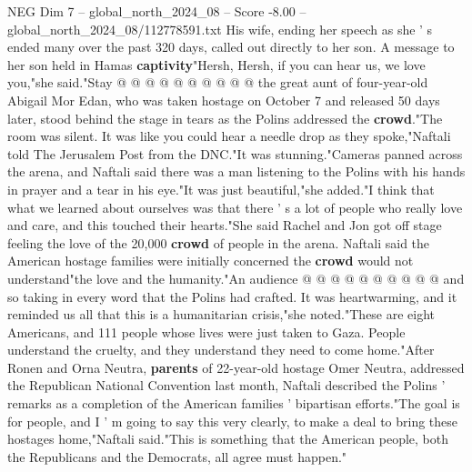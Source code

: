 \begin{textsample}{NEG Dim 7 – global\_north\_2024\_08 – Score -8.00 – global\_north\_2024\_08/112778591.txt}
His wife, ending her speech as she ' s ended many over the past 320 days, called out directly to her son.
A message to her son held in Hamas \textbf{captivity}"Hersh, Hersh, if you can hear us, we love you,"she said."Stay @ @ @ @ @ @ @ @ @ @ the great aunt of four-year-old Abigail Mor Edan, who was taken hostage on October 7 and released 50 days later, stood behind the stage in tears as the Polins addressed the \textbf{crowd}."The room was silent.
It was like you could hear a needle drop as they spoke,"Naftali told The Jerusalem Post from the DNC."It was stunning."Cameras panned across the arena, and Naftali said there was a man listening to the Polins with his hands in prayer and a tear in his eye."It was just beautiful,"she added."I think that what we learned about ourselves was that there ' s a lot of people who really love and care, and this touched their hearts."She said Rachel and Jon got off stage feeling the love of the 20,000 \textbf{crowd} of people in the arena.
Naftali said the American hostage families were initially concerned the \textbf{crowd} would not understand"the love and the humanity."An audience @ @ @ @ @ @ @ @ @ @ and so taking in every word that the Polins had crafted.
It was heartwarming, and it reminded us all that this is a humanitarian crisis,"she noted."These are eight Americans, and 111 people whose lives were just taken to Gaza.
People understand the cruelty, and they understand they need to come home."After Ronen and Orna Neutra, \textbf{parents} of 22-year-old hostage Omer Neutra, addressed the Republican National Convention last month, Naftali described the Polins ' remarks as a completion of the American families ' bipartisan efforts."The goal is for people, and I ' m going to say this very clearly, to make a deal to bring these hostages home,"Naftali said."This is something that the American people, both the Republicans and the Democrats, all agree must happen."

\end{textsample}
